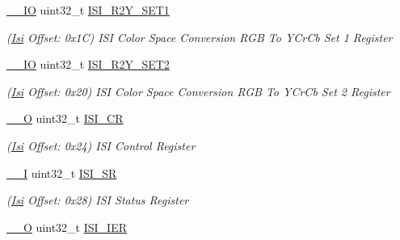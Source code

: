\begin{DoxyCompactItemize}
\mbox{\hyperlink{core__cm7_8h_aec43007d9998a0a0e01faede4133d6be}{\+\_\+\+\_\+\+IO}} uint32\+\_\+t \mbox{\hyperlink{structIsi_a3144500899a87e48ee6cbe38a7d9d433}{I\+S\+I\+\_\+\+R2\+Y\+\_\+\+S\+E\+T1}}
\begin{DoxyCompactList}\small\item\em (\mbox{\hyperlink{structIsi}{Isi}} Offset\+: 0x1C) I\+SI Color Space Conversion R\+GB To Y\+Cr\+Cb Set 1 Register \end{DoxyCompactList}\item 
\mbox{\label{structIsi_a8b49dc64bfffa03d58e82d131b522658}} 
\mbox{\hyperlink{core__cm7_8h_aec43007d9998a0a0e01faede4133d6be}{\+\_\+\+\_\+\+IO}} uint32\+\_\+t \mbox{\hyperlink{structIsi_a8b49dc64bfffa03d58e82d131b522658}{I\+S\+I\+\_\+\+R2\+Y\+\_\+\+S\+E\+T2}}
\begin{DoxyCompactList}\small\item\em (\mbox{\hyperlink{structIsi}{Isi}} Offset\+: 0x20) I\+SI Color Space Conversion R\+GB To Y\+Cr\+Cb Set 2 Register \end{DoxyCompactList}\item 
\mbox{\label{structIsi_af9523865d41fb5d888acbe5f77d66a71}} 
\mbox{\hyperlink{core__cm7_8h_a7e25d9380f9ef903923964322e71f2f6}{\+\_\+\+\_\+O}} uint32\+\_\+t \mbox{\hyperlink{structIsi_af9523865d41fb5d888acbe5f77d66a71}{I\+S\+I\+\_\+\+CR}}
\begin{DoxyCompactList}\small\item\em (\mbox{\hyperlink{structIsi}{Isi}} Offset\+: 0x24) I\+SI Control Register \end{DoxyCompactList}\item 
\mbox{\label{structIsi_a9b86be44ed74a9a6d2911dcc395ad888}} 
\mbox{\hyperlink{core__cm7_8h_af63697ed9952cc71e1225efe205f6cd3}{\+\_\+\+\_\+I}} uint32\+\_\+t \mbox{\hyperlink{structIsi_a9b86be44ed74a9a6d2911dcc395ad888}{I\+S\+I\+\_\+\+SR}}
\begin{DoxyCompactList}\small\item\em (\mbox{\hyperlink{structIsi}{Isi}} Offset\+: 0x28) I\+SI Status Register \end{DoxyCompactList}\item 
\mbox{\label{structIsi_a3df2fb32eab4f761223fab46fe8281a5}} 
\mbox{\hyperlink{core__cm7_8h_a7e25d9380f9ef903923964322e71f2f6}{\+\_\+\+\_\+O}} uint32\+\_\+t \mbox{\hyperlink{structIsi_a3df2fb32eab4f761223fab46fe8281a5}{I\+S\+I\+\_\+\+I\+ER}}

\end{DoxyCompactItemize}
